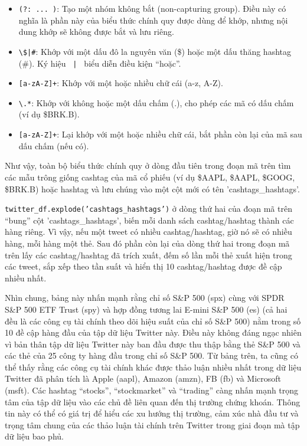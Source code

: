 \begin{itemize}
  \item \texttt{(?: ... )}: Tạo một nhóm không bắt (non-capturing group). Điều này có nghĩa là phần này của biểu thức chính quy được dùng để khớp, nhưng nội dung khớp sẽ không được bắt và lưu riêng.
  \item \texttt{\textbackslash{}\$|\#}: Khớp với một dấu đô la nguyên văn (\$) hoặc một dấu thăng hashtag (\#). Ký hiệu \texttt{ | } biểu diễn điều kiện ``hoặc''.
  \item \texttt{[a-zA-Z]+}: Khớp với một hoặc nhiều chữ cái (a-z, A-Z).
  \item \texttt{\textbackslash{}.*}: Khớp với không hoặc một dấu chấm (.), cho phép các mã có dấu chấm (ví dụ \$BRK.B).
  \item \texttt{[a-zA-Z]+}: Lại khớp với một hoặc nhiều chữ cái, bắt phần còn lại của mã sau dấu chấm (nếu có).
\end{itemize}

Như vậy, toàn bộ biểu thức chính quy ở dòng đầu tiên trong đoạn mã trên tìm các mẫu trông giống cashtag của mã cổ phiếu (ví dụ \$AAPL, \$AAPL, \$GOOG, \$BRK.B) hoặc hashtag và lưu chúng vào một cột mới có tên 'cashtags\_hashtags'.

\texttt{twitter\_df.explode('cashtags\_hashtags')} ở dòng thứ hai của đoạn mã trên ``bung'' cột 'cashtags\_hashtags', biến mỗi danh sách cashtag/hashtag thành các hàng riêng. Vì vậy, nếu một tweet có nhiều cashtag/hashtag, giờ nó sẽ có nhiều hàng, mỗi hàng một thẻ. Sau đó phần còn lại của dòng thứ hai trong đoạn mã trên lấy các cashtag/hashtag đã trích xuất, đếm số lần mỗi thẻ xuất hiện trong các tweet, sắp xếp theo tần suất và hiển thị 10 cashtag/hashtag được đề cập nhiều nhất.

Nhìn chung, bảng này nhấn mạnh rằng chỉ số S\&P 500 (spx) cùng với SPDR S\&P 500 ETF Trust (spy) và hợp đồng tương lai E-mini S\&P 500 (es) (cả hai đều là các công cụ tài chính theo dõi hiệu suất của chỉ số S\&P 500) nằm trong số 10 đề cập hàng đầu của tập dữ liệu Twitter này. Điều này không đáng ngạc nhiên vì bản thân tập dữ liệu Twitter này ban đầu được thu thập bằng thẻ S\&P 500 và các thẻ của 25 công ty hàng đầu trong chỉ số S\&P 500. Từ bảng trên, ta cũng có thể thấy rằng các công cụ tài chính khác được thảo luận nhiều nhất trong dữ liệu Twitter đã phân tích là Apple (aapl), Amazon (amzn), FB (fb) và Microsoft (msft). Các hashtag ``stocks'', ``stockmarket'' và ``trading'' càng nhấn mạnh trọng tâm của tập dữ liệu vào các chủ đề liên quan đến thị trường chứng khoán. Thông tin này có thể có giá trị để hiểu các xu hướng thị trường, cảm xúc nhà đầu tư và trọng tâm chung của các thảo luận tài chính trên Twitter trong giai đoạn mà tập dữ liệu bao phủ.

